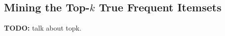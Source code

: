\subsection{Mining the Top-$k$ True Frequent Itemsets}\label{sect:topk}
{\bf TODO: } talk about topk.
